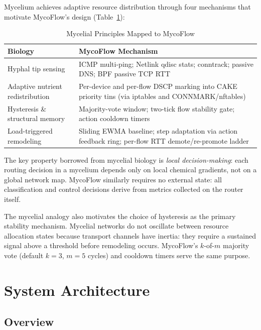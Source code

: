\documentclass[conference]{IEEEtran}
\begin{document}
Mycelium achieves adaptive resource distribution through four mechanisms
that motivate MycoFlow's design (Table~\ref{tab:bio}):

\begin{table}[t]
\caption{Mycelial Principles Mapped to MycoFlow}
\label{tab:bio}
\centering
\small
\begin{tabular}{p{2.0cm}p{5.6cm}}
\toprule
\textbf{Biology} & \textbf{MycoFlow Mechanism} \\
\midrule
Hyphal tip sensing & ICMP multi-ping; Netlink qdisc stats; conntrack; passive DNS; BPF passive TCP RTT \\
Adaptive nutrient redistribution & Per-device and per-flow DSCP marking into CAKE priority tins (via iptables and CONNMARK/nftables) \\
Hysteresis \& structural memory & Majority-vote window; two-tick flow stability gate; action cooldown timers \\
Load-triggered remodeling & Sliding EWMA baseline; step adaptation via action feedback ring; per-flow RTT demote/re-promote ladder \\
\bottomrule
\end{tabular}
\end{table}

The key property borrowed from mycelial biology is \emph{local decision-making}:
each routing decision in a mycelium depends only on local chemical gradients,
not on a global network map.
MycoFlow similarly requires no external state: all classification and control
decisions derive from metrics collected on the router itself.

The mycelial analogy also motivates the choice of hysteresis as the primary
stability mechanism.
Mycelial networks do not oscillate between resource allocation states because
transport channels have inertia: they require a sustained signal above a
threshold before remodeling occurs.
MycoFlow's $k$-of-$m$ majority vote (default $k=3$, $m=5$ cycles) and
cooldown timers serve the same purpose.

\section{System Architecture}
\label{sec:architecture}

\subsection{Overview}
\end{document}

